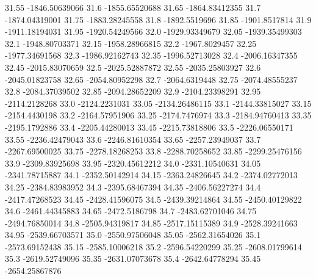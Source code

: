           31.55   -1846.50639066
           31.6   -1855.65520688
          31.65   -1864.83412355
           31.7   -1874.04319001
          31.75   -1883.28245558
           31.8    -1892.5519696
          31.85    -1901.8517814
           31.9   -1911.18194031
          31.95   -1920.54249566
           32.0   -1929.93349679
          32.05   -1939.35499303
           32.1   -1948.80703371
          32.15   -1958.28966815
           32.2    -1967.8029457
          32.25   -1977.34691568
           32.3   -1986.92162743
          32.35   -1996.52713028
           32.4   -2006.16347355
          32.45   -2015.83070659
           32.5   -2025.52887872
          32.55   -2035.25803927
           32.6   -2045.01823758
          32.65   -2054.80952298
           32.7    -2064.6319448
          32.75   -2074.48555237
           32.8   -2084.37039502
          32.85   -2094.28652209
           32.9   -2104.23398291
          32.95    -2114.2128268
           33.0    -2124.2231031
          33.05   -2134.26486115
           33.1   -2144.33815027
          33.15    -2154.4430198
           33.2   -2164.57951906
          33.25    -2174.7476974
           33.3   -2184.94760413
          33.35    -2195.1792886
           33.4   -2205.44280013
          33.45   -2215.73818806
           33.5   -2226.06550171
          33.55   -2236.42479043
           33.6   -2246.81610354
          33.65   -2257.23949037
           33.7   -2267.69500025
          33.75   -2278.18268253
           33.8   -2288.70258652
          33.85   -2299.25476156
           33.9   -2309.83925698
          33.95   -2320.45612212
           34.0   -2331.10540631
          34.05   -2341.78715887
           34.1   -2352.50142914
          34.15   -2363.24826645
           34.2   -2374.02772013
          34.25   -2384.83983952
           34.3   -2395.68467394
          34.35   -2406.56227274
           34.4   -2417.47268523
          34.45   -2428.41596075
           34.5   -2439.39214864
          34.55   -2450.40129822
           34.6   -2461.44345883
          34.65    -2472.5186798
           34.7   -2483.62701046
          34.75   -2494.76850014
           34.8   -2505.94319817
          34.85   -2517.15115389
           34.9   -2528.39241663
          34.95   -2539.66703571
           35.0   -2550.97506048
          35.05   -2562.31654026
           35.1   -2573.69152438
          35.15   -2585.10006218
           35.2   -2596.54220299
          35.25   -2608.01799614
           35.3   -2619.52749096
          35.35   -2631.07073678
           35.4   -2642.64778294
          35.45   -2654.25867876
